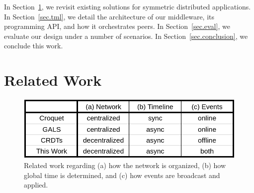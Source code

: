 \documentclass[12pt]{article}
\begin{document}
In Section~\ref{sec.related}, we revisit existing solutions for symmetric
distributed applications.
In Section~\ref{sec.tml}, we detail the architecture of our middleware, its
programming API, and how it orchestrates peers.
In Section~\ref{sec.eval}, we evaluate our design under a number of scenarios.
In Section~\ref{sec.conclusion}, we conclude this work.

\section{Related Work}
\label{sec.related}

\begin{figure}
  \centering
  \includegraphics[width=0.75\linewidth]{table}
  \caption{
    Related work regarding
        (a) how the network is organized,
        (b) how global time is determined, and
        (c) how events are broadcast and applied.
    \label{fig.table}
  }
\end{figure}
\end{document}
